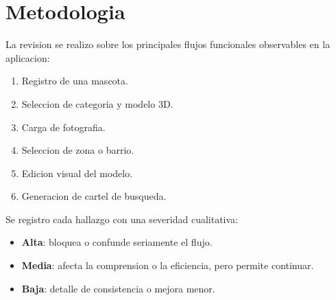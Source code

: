 \documentclass[12pt,a4paper]{article}
\begin{document}
\section{Metodologia}
La revision se realizo sobre los principales flujos funcionales observables en la aplicacion:
\begin{enumerate}[leftmargin=*]
  \item Registro de una mascota.
  \item Seleccion de categoria y modelo 3D.
  \item Carga de fotografia.
  \item Seleccion de zona o barrio.
  \item Edicion visual del modelo.
  \item Generacion de cartel de busqueda.
\end{enumerate}

Se registro cada hallazgo con una severidad cualitativa:
\begin{itemize}[leftmargin=*]
  \item \textbf{Alta}: bloquea o confunde seriamente el flujo.
  \item \textbf{Media}: afecta la comprension o la eficiencia, pero permite continuar.
  \item \textbf{Baja}: detalle de consistencia o mejora menor.
\end{itemize}
\end{document}
